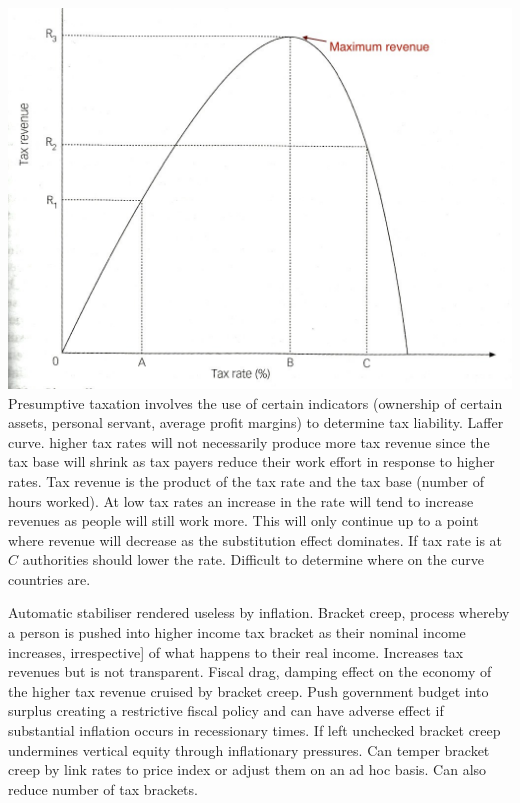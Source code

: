 \documentclass[12pt]{examnotes}
\begin{document}
\includegraphics[scale=0.3]{./imgs/124.jpg}
\ra Presumptive taxation involves the use of certain indicators (ownership of certain assets, personal servant, average profit margins) to determine tax liability.
\ra Laffer curve. higher tax rates will not necessarily produce more tax revenue since the tax base will shrink as tax payers reduce their work effort in response to higher rates. 
\ra Tax revenue is the product of the tax rate and the tax base (number of hours worked). At low tax rates an increase in the rate will tend to increase revenues as people will still work more. This will only continue up to a point where revenue will decrease as the substitution effect dominates.
\ra If tax rate is at $C$ authorities should lower the rate. Difficult to determine where on the curve countries are.

\ra Automatic stabiliser rendered useless by inflation.
\ra Bracket creep, process whereby a person is pushed into higher income tax bracket as their nominal income increases, irrespective] of what happens to their real income. Increases tax revenues but is not transparent.
\ra Fiscal drag, damping effect on the economy of the higher tax revenue cruised by bracket creep. Push  government budget into surplus creating a restrictive fiscal policy and can have adverse effect if substantial inflation occurs in recessionary times.
\ra If left unchecked bracket creep undermines vertical equity through inflationary pressures.
\ra Can temper bracket creep by link rates to price index or adjust them on an ad hoc basis. Can also reduce number of tax brackets.
\end{document}
